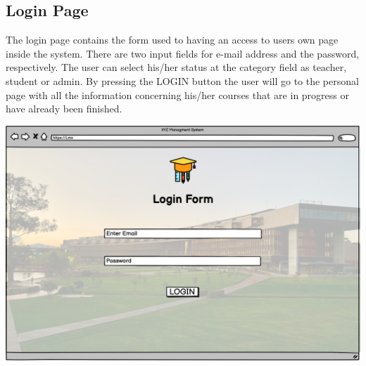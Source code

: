 \subsection{Login Page}
  
The login page contains the form used to having an access to users own page inside the system. There are two input fields for e-mail address and the password, respectively. The user can select his/her status at the category field as teacher, student or admin. By pressing the LOGIN button the user will go to the personal page with all the information concerning his/her courses that are in progress or have already been finished. 

\includegraphics[width=\columnwidth]{images/LoginForm.png}
